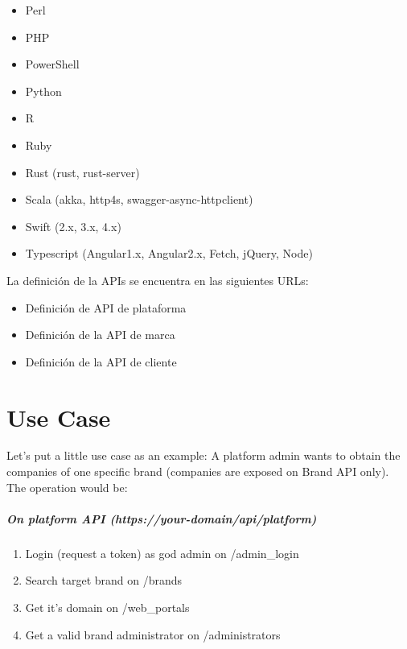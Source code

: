 \documentclass[letterpaper,10pt,spanish]{sphinxmanual}
\begin{document}
\begin{itemize}
\item {} 
Perl

\item {} 
PHP

\item {} 
PowerShell

\item {} 
Python

\item {} 
R

\item {} 
Ruby

\item {} 
Rust (rust, rust-server)

\item {} 
Scala (akka, http4s, swagger-async-httpclient)

\item {} 
Swift (2.x, 3.x, 4.x)

\item {} 
Typescript (Angular1.x, Angular2.x, Fetch, jQuery, Node)

\end{itemize}

La definición de la APIs se encuentra en las siguientes URLs:
\begin{itemize}
\item {} 
Definición de API de plataforma

\item {} 
Definición de la API de marca

\item {} 
Definición de la API de cliente

\end{itemize}


\chapter{Use Case}
\label{api_rest/use_case:use-case}\label{api_rest/use_case::doc}
Let's put a little use case as an example: A platform admin wants to obtain the companies of one specific brand (companies are exposed on Brand API only). The operation would be:
\paragraph{On platform API (https://your-domain/api/platform)}
\begin{enumerate}
\item {} 
Login (request a token) as god admin on /admin\_login

\item {} 
Search target brand on /brands

\item {} 
Get it's domain on /web\_portals

\item {} 
Get a valid brand administrator on /administrators

\end{enumerate}
\end{document}
